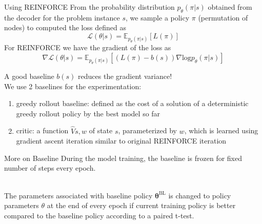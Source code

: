 \documentclass[9pt]{beamer}
\begin{document}
\begin{frame}{Using REINFORCE}
From the probability distribution $p_\theta(\pi|s)$ obtained from the decoder for the problem instance $s$, we sample a policy $\pi$ (permutation of nodes) to computed the loss defined as\\
\[\mathcal{L}(\theta|s)=\mathbb{E}_{p_\theta(\pi|s)}[L(\pi)]\]
For REINFORCE we have the gradient of the loss as
\[\nabla\mathcal{L}(\theta|s)=\mathbb{E}_{p_\theta(\pi|s)}[(L(\pi)-b(s))\nabla \text{log}p_\theta(\pi|s)]\]

A good baseline $b(s)$ reduces the gradient variance!\\
We use 2 baselines for the experimentation:
\begin{enumerate}
    \item greedy rollout baseline: defined as the cost of a solution of a deterministic greedy rollout policy by the best model so far
    \item critic: a function $\hat{V}{s,w}$ of state $s$, parameterized by $w$, which is learned using gradient ascent iteration similar to original REINFORCE iteration
\end{enumerate}
\end{frame}
\begin{frame}{More on Baseline}
    During the model training, the baseline is frozen for fixed number of steps every epoch.
    
    \bigskip\\
    
    The parameters associated with baseline policy $\bm{\theta}^{\text{BL}}$ is changed to policy parameters $\theta$ at the end of every epoch if current training policy is better compared to the baseline policy according to a paired t-test. 
\end{frame}
\end{document}
